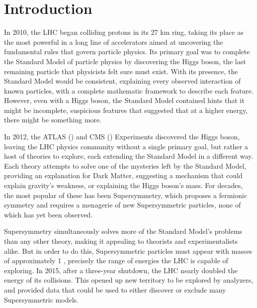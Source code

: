 
\chapter{Introduction} %

\label{ch:introduction} %


In 2010, the \acf{LHC} began colliding protons in its 27 km ring, taking its place as the most powerful in a long line of accelerators aimed at uncovering the fundamental rules that govern particle physics. Its primary goal was to complete the Standard Model of particle physics by discovering the Higgs boson, the last remaining particle that physicists felt sure must exist. With its presence, the Standard Model would be consistent, explaining every observed interaction of known particles, with a complete mathematic framework to describe each feature. However, even with a Higgs boson, the Standard Model contained hints that it might be incomplete, suspicious features that suggested that at a higher energy, there might be something more.

In 2012, the \acs{ATLAS} () and \acs{CMS} () Experiments discovered the Higgs boson, leaving the \ac{LHC} physics community without a single primary goal, but rather a host of theories to explore, each extending the Standard Model in a different way. Each theory attempts to solve one of the mysteries left by the Standard Model, providing an explanation for Dark Matter, suggesting a mechanism that could explain gravity's weakness, or explaining the Higgs boson's mass. For decades, the most popular of these has been Supersymmetry, which proposes a fermionic symmetry and requires a menagerie of new Supersymmetric particles, none of which has yet been observed. 

Supersymmetry simultaneously solves more of the Standard Mo\-del's problems than any other theory, making it appealing to theorists and experimentalists alike. But in order to do this, Supersymmetric particles must appear with masses of approximately 1 \tev, precisely the range of energies the \ac{LHC} is capable of exploring. In 2015, after a three-year shutdown, the \ac{LHC} nearly doubled the energy of its collisions. This opened up new territory to be explored by analyzers, and provided data that could be used to either discover or exclude many Supersymmetric models.

